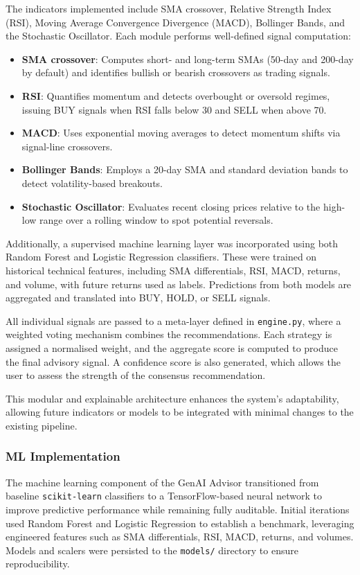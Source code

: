 The indicators implemented include SMA crossover, Relative Strength Index (RSI), Moving Average Convergence Divergence (MACD), Bollinger Bands, and the Stochastic Oscillator. Each module performs well-defined signal computation:
\begin{itemize}
\item \textbf{SMA crossover}: Computes short- and long-term SMAs (50-day and 200-day by default) and identifies bullish or bearish crossovers as trading signals.
\item \textbf{RSI}: Quantifies momentum and detects overbought or oversold regimes, issuing BUY signals when RSI falls below 30 and SELL when above 70.
\item \textbf{MACD}: Uses exponential moving averages to detect momentum shifts via signal-line crossovers.
\item \textbf{Bollinger Bands}: Employs a 20-day SMA and standard deviation bands to detect volatility-based breakouts.
\item \textbf{Stochastic Oscillator}: Evaluates recent closing prices relative to the high-low range over a rolling window to spot potential reversals.
\end{itemize}

Additionally, a supervised machine learning layer was incorporated using both Random Forest and Logistic Regression classifiers. These were trained on historical technical features, including SMA differentials, RSI, MACD, returns, and volume, with future returns used as labels. Predictions from both models are aggregated and translated into BUY, HOLD, or SELL signals.

All individual signals are passed to a meta-layer defined in \texttt{engine.py}, where a weighted voting mechanism combines the recommendations. Each strategy is assigned a normalised weight, and the aggregate score is computed to produce the final advisory signal. A confidence score is also generated, which allows the user to assess the strength of the consensus recommendation.

This modular and explainable architecture enhances the system’s adaptability, allowing future indicators or models to be integrated with minimal changes to the existing pipeline.

\subsubsection{ML Implementation}

The machine learning component of the GenAI Advisor transitioned from baseline \texttt{scikit-learn} classifiers to a TensorFlow-based neural network to improve predictive performance while remaining fully auditable. Initial iterations used Random Forest and Logistic Regression to establish a benchmark, leveraging engineered features such as SMA differentials, RSI, MACD, returns, and volumes. Models and scalers were persisted to the \texttt{models/} directory to ensure reproducibility.

